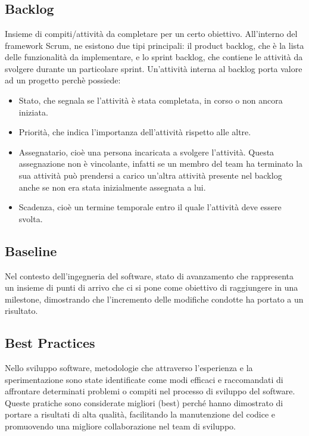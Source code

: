 \newpage



\section{}

\subsection*{Backlog}
Insieme di compiti/attività da completare per un certo obiettivo. All’interno del framework Scrum, ne esistono due tipi principali: il product backlog, 
che è la lista delle funzionalità da implementare, e lo sprint backlog, che contiene le attività da svolgere durante un particolare sprint.
Un’attività interna al backlog porta valore ad un progetto perchè possiede:
\begin{itemize}
    \item Stato, che segnala se l’attività è stata completata, in corso o non ancora iniziata.
    \item Priorità, che indica l’importanza dell’attività rispetto alle altre.
    \item Assegnatario, cioè una persona incaricata a svolgere l’attività. Questa assegnazione non è vincolante, infatti se un membro del team ha terminato 
    la sua attività può prendersi a carico un’altra attività presente nel backlog anche se non era stata inizialmente assegnata a lui.
    \item Scadenza, cioè un termine temporale entro il quale l’attività deve essere svolta.
\end{itemize}

\hypertarget{sec:baseline}{}
\subsection*{Baseline}
Nel contesto dell'ingegneria del software, stato di avanzamento che rappresenta un insieme di punti di arrivo che ci si pone come obiettivo di raggiungere 
in una milestone, dimostrando che l'incremento delle modifiche condotte ha portato a un risultato.

\subsection*{Best Practices}
Nello sviluppo software, metodologie che attraverso l’esperienza e la sperimentazione sono state identificate come modi efficaci e raccomandati di 
affrontare determinati problemi o compiti nel processo di sviluppo del software. Queste pratiche sono considerate migliori (best) perché hanno dimostrato 
di portare a risultati di alta qualità, facilitando la manutenzione del codice e promuovendo una migliore collaborazione nel team di sviluppo.

